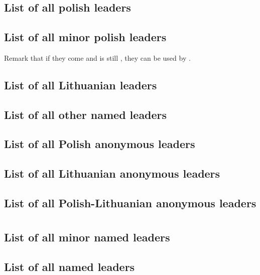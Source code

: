 \section{\paysmajeurPologne}
\subsection{List of all polish leaders}
\subsection{List of all minor polish leaders}
\aparag Remark that if they come and \paysPologne is still \MAJ, they can be
used by \POL.
\subsection{List of all Lithuanian leaders}
\subsection{List of all other named leaders}
\subsection{List of all Polish anonymous leaders}
\listanonymepologne
\subsection{List of all Lithuanian anonymous leaders}
\listanonymelithuanie
\subsection{List of all Polish-Lithuanian anonymous leaders}
\listanonymepollit

\section{\paysmajeurPrusse}
\subsection{List of all minor named leaders}
\subsection{List of all named leaders}
\list@anonyme

